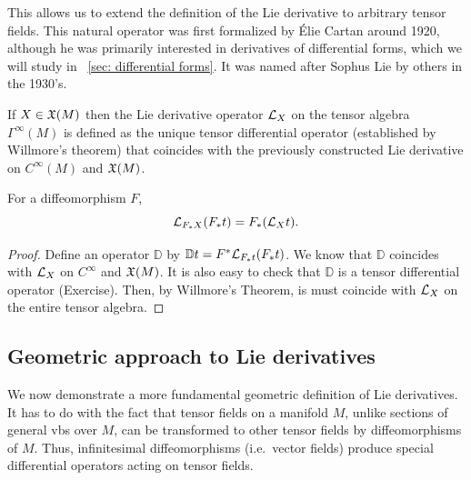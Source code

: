 This allows us to extend the definition of the Lie derivative to arbitrary tensor fields. This natural operator was first formalized by \'Elie Cartan around 1920, although he was primarily interested in derivatives of differential forms, which we will study in \Sect~\ref{sec: differential forms}. It was named after Sophus Lie by others in the 1930's.

\begin{defn}
If $X\in\mathfrak{X}(M)$ then the Lie derivative operator $\mathcal{L}_X$ on the tensor algebra $\Gamma^\infty(M)$ is defined as the unique tensor differential operator (established by Willmore's theorem) that coincides with the previously constructed Lie derivative on $C^\infty(M)$ and $\mathfrak{X}(M)$.
\end{defn}

\begin{prop}\label{pullbacks of Lie derivatives}
For a diffeomorphism $F$, 
\[\mathcal{L}_{F_\ast X}(F_\ast t)=F_\ast (\mathcal{L}_X t).\]
\end{prop}
\begin{proof}
Define an operator $\mathbb{D}$ by $\mathbb{D}t=F^\ast \mathcal{L}_{F_\ast t}(F_\ast t)$. We know that $\mathbb{D}$ coincides with $\mathcal{L}_X$ on $C^\infty$ and $\mathfrak{X}(M)$. It is also easy to check that $\mathbb{D}$ is a tensor differential operator (Exercise). Then, by Willmore's Theorem, is must coincide with $\mathcal{L}_X$ on the entire tensor algebra.
\end{proof}

\subsection{Geometric approach to Lie derivatives}

We now demonstrate a more fundamental geometric definition of Lie derivatives. It has to do with the fact that tensor fields on a manifold $M$, unlike sections of general \glspl{vb} over $M$, can be transformed to other tensor fields by diffeomorphisms of $M$. Thus, infinitesimal diffeomorphisms (i.e.\ vector fields) produce special differential operators acting on tensor fields.

